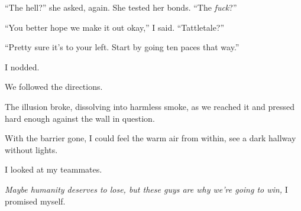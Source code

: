 ``The hell?'' she asked, again.  She tested her bonds.  ``The \emph{fuck}?''



``You better hope we make it out okay,'' I said.  ``Tattletale?''



``Pretty sure it's to your left.  Start by going ten paces that way.''



I nodded.



We followed the directions.



The illusion broke, dissolving into harmless smoke, as we reached it and pressed hard enough against the wall in question.



With the barrier gone, I could feel the warm air from within, see a dark hallway without lights.



I looked at my teammates.



\emph{Maybe humanity deserves to lose, but these guys are why we're going to win, }I promised myself.





